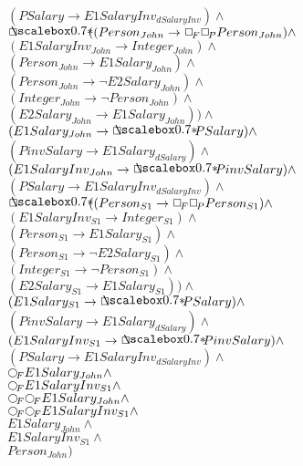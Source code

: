 \documentclass[a4paper,10pt]{article}
\begin{document}
 $ (PSalary \rightarrow E1SalaryInv_{dSalaryInv}) \land $ \\ 
 $  \SVbox ((Person_{John} \rightarrow  \Rbox  \Lbox Person_{John}) \land $ \\ 
 $ (E1SalaryInv_{John} \rightarrow Integer_{John}) \land $ \\ 
 $ (Person_{John} \rightarrow E1Salary_{John}) \land $ \\ 
 $ (Person_{John} \rightarrow  \lnot E2Salary_{John}) \land $ \\ 
 $ (Integer_{John} \rightarrow  \lnot Person_{John}) \land $ \\ 
 $ (E2Salary_{John} \rightarrow E1Salary_{John})) \land $ \\ 
 $ (E1Salary_{John} \rightarrow  \SVbox PSalary) \land $ \\ 
 $ (PinvSalary \rightarrow E1Salary_{dSalary}) \land $ \\ 
 $ (E1SalaryInv_{John} \rightarrow  \SVbox PinvSalary) \land $ \\ 
 $ (PSalary \rightarrow E1SalaryInv_{dSalaryInv}) \land $ \\ 
 $  \SVbox ((Person_{S1} \rightarrow  \Rbox  \Lbox Person_{S1}) \land $ \\ 
 $ (E1SalaryInv_{S1} \rightarrow Integer_{S1}) \land $ \\ 
 $ (Person_{S1} \rightarrow E1Salary_{S1}) \land $ \\ 
 $ (Person_{S1} \rightarrow  \lnot E2Salary_{S1}) \land $ \\ 
 $ (Integer_{S1} \rightarrow  \lnot Person_{S1}) \land $ \\ 
 $ (E2Salary_{S1} \rightarrow E1Salary_{S1})) \land $ \\ 
 $ (E1Salary_{S1} \rightarrow  \SVbox PSalary) \land $ \\ 
 $ (PinvSalary \rightarrow E1Salary_{dSalary}) \land $ \\ 
 $ (E1SalaryInv_{S1} \rightarrow  \SVbox PinvSalary) \land $ \\ 
 $ (PSalary \rightarrow E1SalaryInv_{dSalaryInv}) \land $ \\ 
 $  \Rnext E1Salary_{John} \land $ \\ 
 $  \Rnext E1SalaryInv_{S1} \land $ \\ 
 $  \Rnext  \Rnext E1Salary_{John} \land $ \\ 
 $  \Rnext  \Rnext E1SalaryInv_{S1} \land $ \\ 
 $ E1Salary_{John} \land $ \\ 
 $ E1SalaryInv_{S1} \land $ \\ 
 $ Person_{John})$ 
\end{document}
